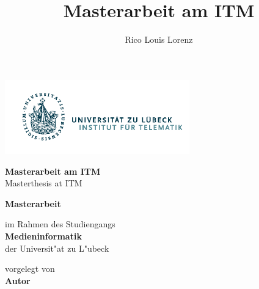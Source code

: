 \documentclass[
	ngerman,
	11pt,
	twoside,
	a4paper,
	headsepline,
	footsepline, 
	toc=bib
]{scrbook}
\begin{document}
\begin{titlepage}

\title{Masterarbeit am ITM}
\author{Rico Louis Lorenz}

{\Large
	\includegraphics[width=80mm]{images/Logo_Inst_Telematik_cropped.pdf}
	\vskip 44pt


	\textbf{\LARGE Masterarbeit am ITM}\\
	\LARGE Masterthesis at ITM

	\titlepageskip
	\textbf{Masterarbeit}

	\titlepageskip
	im Rahmen des Studiengangs\\
	\textbf{Medieninformatik}\\
	der Universit"at zu L"ubeck

	\titlepageskip
	vorgelegt von\\
	\textbf{Autor}

}
\end{titlepage}
\end{document}
